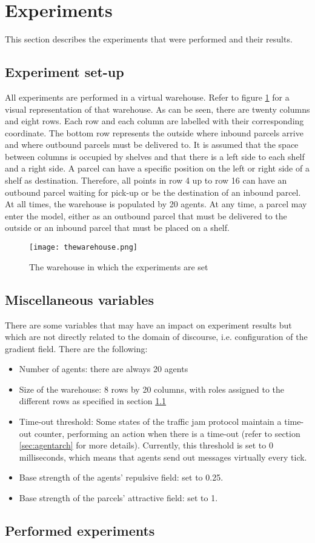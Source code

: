 \section{Experiments}\label{sec:experiments}
This section describes the experiments that were performed and their results.

\subsection{Experiment set-up}\label{sec:setup}
All experiments are performed in a virtual warehouse. Refer to figure \ref{fig:thewarehouse} for a visual representation of that warehouse. As can be seen, there are twenty columns and eight rows. Each row and each column are labelled with their corresponding coordinate. The bottom row represents the outside where inbound parcels arrive and where outbound parcels must be delivered to. It is assumed that the space between columns is occupied by shelves and that there is a left side to each shelf and a right side. A parcel can have a specific position on the left or right side of a shelf as destination. Therefore, all points in row 4 up to row 16 can have an outbound parcel waiting for pick-up or be the destination of an inbound parcel. At all times, the warehouse is populated by 20 agents. At any time, a parcel may enter the model, either as an outbound parcel that must be delivered to the outside or an inbound parcel that must be placed on a shelf. 

\begin{figure}[H]
    \centering
    \texttt{[image: thewarehouse.png]}
    \caption{The warehouse in which the experiments are set}
    \label{fig:thewarehouse}
\end{figure}

\subsection{Miscellaneous variables}
There are some variables that may have an impact on experiment results but which are not directly related to the domain of discourse, i.e. configuration of the gradient field. There are the following:

\begin{itemize}
    \item Number of agents: there are always 20 agents
    \item Size of the warehouse: 8 rows by 20 columns, with roles assigned to the different rows as specified in section \ref{sec:setup}
    \item Time-out threshold: Some states of the traffic jam protocol maintain a time-out counter, performing an action when there is a time-out (refer to section \ref{sec:agentarch} for more details). Currently, this threshold is set to 0 milliseconds, which means that agents send out messages virtually every tick.
    \item Base strength of the agents' repulsive field: set to 0.25.
    \item Base strength of the parcels' attractive field: set to 1.
\end{itemize}

\subsection{Performed experiments}